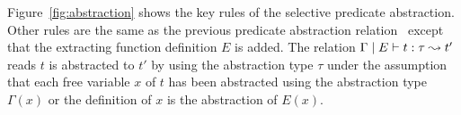 
Figure~\ref{fig:abstraction} shows the key rules of the selective
predicate abstraction.  Other rules are the same as the previous predicate
abstraction relation~\cite{KobayashiPLDI2011} except that the extracting
function definition $E$ is added.  The relation
${\Gamma} \mid {E} \vdash {t} : {\tau} \leadsto {t'}$ reads $t$ is abstracted to $t'$ by using
the abstraction type $\tau$ under the assumption that each free variable
$x$ of $t$ has been abstracted using the abstraction type $\Gamma(x)$ or
the definition of $x$ is the abstraction of $E(x)$.

